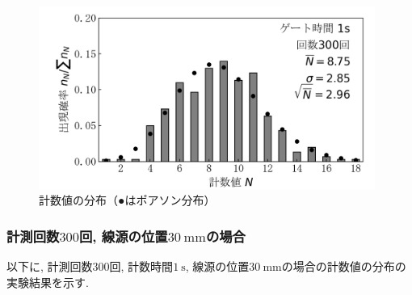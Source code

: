 \documentclass{jarticle}
\begin{document}
\begin{figure}[H]
  \begin{center}
    \includegraphics[width=110mm]{graph/count-distribution-60mm-300times.png}
    \caption{計数値の分布（●はポアソン分布）}
    \label{fg:count-distribution-60mm-300times}
  \end{center}
\end{figure}


\subsubsection{計測回数$300$回, 線源の位置$30\ \mathrm{mm}$の場合}

以下に, 計測回数$300$回, 計数時間$1\ \mathrm{s}$, 線源の位置$30\ \mathrm{mm}$の場合の計数値の分布の実験結果を示す.
\end{document}
